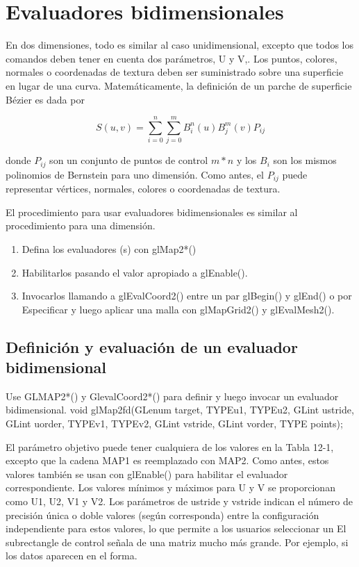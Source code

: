 
\section{Evaluadores bidimensionales}

En dos dimensiones, todo es similar al caso unidimensional, excepto que todos los comandos deben
tener en cuenta dos parámetros, U y V,. Los puntos, colores, normales o coordenadas de textura deben ser
suministrado sobre una superficie en lugar de una curva. Matemáticamente, la definición de un parche de superficie Bézier es
dada por


\begin{equation}
    S(u,v)=\sum_{i=0}^{n}\sum_{j=0}^{m} B_{i}^{n}(u) B_{j}^{m}(v)P_{ij}
\end{equation}

donde $P_{ij}$ son un conjunto de puntos de control $m*n$ y los $B_{i}$ son los mismos polinomios de Bernstein para uno
dimensión. Como antes, el $P_{ij}$ puede representar vértices, normales, colores o coordenadas de textura.


El procedimiento para usar evaluadores bidimensionales es similar al procedimiento para una dimensión.


\begin{enumerate}
    \item Defina los evaluadores (s) con glMap2*()
    \item Habilitarlos pasando el valor apropiado a glEnable().
    \item Invocarlos llamando a glEvalCoord2() entre un par glBegin() y glEnd() o por
    Especificar y luego aplicar una malla con glMapGrid2() y glEvalMesh2().
\end{enumerate}


\subsection{Definición y evaluación de un evaluador bidimensional}


Use GLMAP2*() y GlevalCoord2*() para definir y luego invocar un evaluador bidimensional.
void glMap2{fd}(GLenum target, TYPEu1, TYPEu2, GLint ustride,
GLint uorder, TYPEv1, TYPEv2, GLint vstride,
GLint vorder, TYPE points);

El parámetro objetivo puede tener cualquiera de los valores en la Tabla 12-1, excepto que la cadena MAP1 es
reemplazado con MAP2. Como antes, estos valores también se usan con glEnable() para habilitar el
evaluador correspondiente. Los valores mínimos y máximos para U y V se proporcionan como U1, U2,
V1 y V2. Los parámetros de ustride y vstride indican el número de precisión única o doble
valores (según corresponda) entre la configuración independiente para estos valores, 
lo que permite a los usuarios seleccionar un
El subrectangle de control señala de una matriz mucho más grande. Por ejemplo, si los datos aparecen en el
forma.

